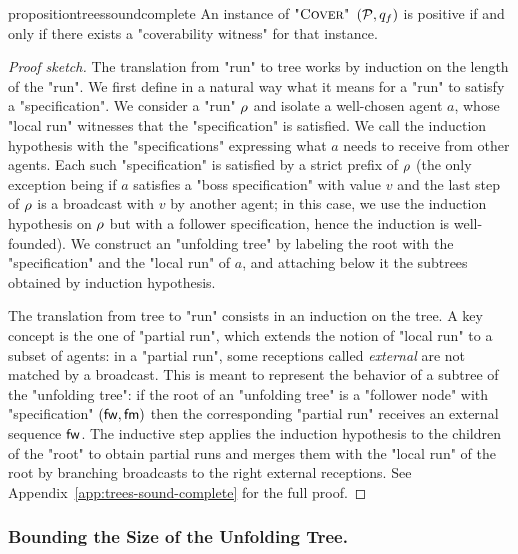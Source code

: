 \begin{restatable}{proposition}{treessoundcomplete}
	\label{prop:trees-sound-complete}
	An instance of $\textsc{"Cover"}$ $(\mathcal{P},q_f)$ is positive if and only if there exists a "coverability witness" for that instance.
\end{restatable}
\begin{proof}[Proof sketch]
	The translation from "run" to tree works by induction on the length of the "run". We first define in a natural way what it means for a "run" to satisfy a "specification". We consider a "run" $\rho$ and isolate a well-chosen agent $a$, whose "local run" witnesses that the "specification" is satisfied. We call the induction hypothesis with the "specifications" expressing what $a$ needs to receive from other agents. Each such "specification" is satisfied by a strict prefix of $\rho$ (the only exception being if $a$ satisfies a "boss specification" with value $v$ and the last step of $\rho$ is a broadcast with $v$ by another agent; in this case, we use the induction hypothesis on $\rho$ but with a follower specification, hence the induction is well-founded).
	We construct an "unfolding tree" by labeling the root with the "specification" and the "local run" of $a$, and attaching below it the subtrees obtained by induction hypothesis.
	
	The translation from tree to "run" consists in an induction on the tree. A key concept is the one of "partial run", which extends the notion of "local run" to a subset of agents: in a "partial run", some receptions called \emph{external} are not matched by a broadcast. This is meant to represent the behavior of a subtree of the "unfolding tree": if the root of an "unfolding tree" is a "follower node" with "specification" $(\mathsf{fw}, \mathsf{fm})$ then the corresponding "partial run" receives an external sequence $\mathsf{fw}$. The inductive step applies the induction hypothesis to the children of the "root" to obtain partial runs and merges them with the "local run" of the root by branching broadcasts to the right external receptions. 
	See Appendix~\ref{app:trees-sound-complete} for the full proof. 
\end{proof}





\subsubsection{Bounding the Size of the Unfolding Tree.}
\label{sec:tree-bounds}

